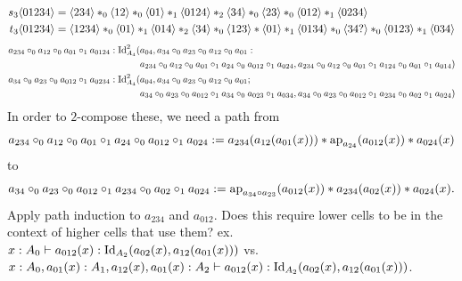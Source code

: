 \documentclass{article}
\begin{document}
\begin{align*}
    s_3\langle01234\rangle&=\langle234\rangle*_0\langle12\rangle*_0\langle01\rangle*_1\langle0124\rangle*_2\langle34\rangle*_0\langle23\rangle*_0\langle012\rangle*_1\langle0234\rangle\\
    t_3\langle01234\rangle&=\langle1234\rangle*_0\langle01\rangle*_1\langle014\rangle*_2\langle34\rangle*_0\langle123\rangle*\langle01\rangle*_1\langle0134\rangle*_0\langle34?\rangle*_0\langle0123\rangle*_1\langle034\rangle\\
\end{align*}
\begin{align*}
    a_{234}\circ_0a_{12}\circ_0a_{01}\circ_1a_{0124}:\operatorname{Id}_{A_4}^2(&a_{04},a_{34}\circ_0a_{23}\circ_0a_{12}\circ_0a_{01}:\\
    &a_{234}\circ_0a_{12}\circ_0a_{01}\circ_1a_{24}\circ_0a_{012}\circ_1a_{024},a_{234}\circ_0a_{12}\circ_0a_{01}\circ_1a_{124}\circ_0a_{01}\circ_1a_{014})\\
    a_{34}\circ_0a_{23}\circ_0a_{012}\circ_1a_{0234}:\operatorname{Id}_{A_4}^2(&a_{04},a_{34}\circ_0a_{23}\circ_0a_{12}\circ_0a_{01};\\
    &a_{34}\circ_0a_{23}\circ_0a_{012}\circ_1a_{34}\circ_0a_{023}\circ_1a_{034}, a_{34}\circ_0a_{23}\circ_0a_{012}\circ_1a_{234}\circ_0a_{02}\circ_1a_{024})
\end{align*}
In order to $2$-compose these, we need a path from
$$ a_{234}\circ_0a_{12}\circ_0a_{01}\circ_1a_{24}\circ_0a_{012}\circ_1a_{024}:=a_{234}(a_{12}(a_{01}(x)))*\operatorname{ap}_{a_{24}}(a_{012}(x))*a_{024}(x) $$
to
$$ a_{34}\circ_0a_{23}\circ_0a_{012}\circ_1a_{234}\circ_0a_{02}\circ_1a_{024}:=\operatorname{ap}_{a_{34}\circ a_{23}}(a_{012}(x))*a_{234}(a_{02}(x))*a_{024}(x). $$
Apply path induction to $a_{234}$ and $a_{012}$. Does this require lower cells to be in the context of higher cells that use them? ex. $x:A_0\vdash a_{012}(x):\operatorname{Id}_{A_2}(a_{02}(x),a_{12}(a_{01}(x)))$ vs. $x:A_0,a_{01}(x):A_1,a_{12}(x),a_{01}(x):A_2\vdash a_{012}(x):\operatorname{Id}_{A_2}(a_{02}(x),a_{12}(a_{01}(x)))$.
\end{document}
